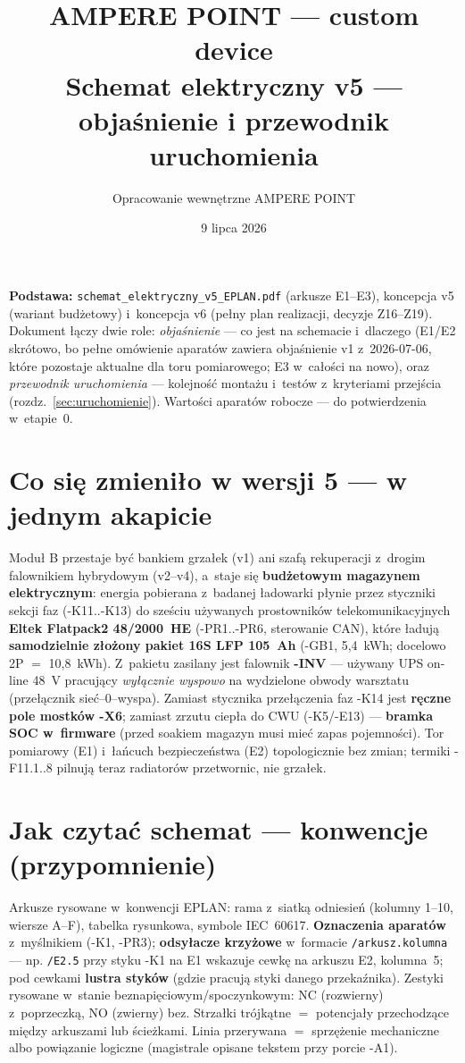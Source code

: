 \documentclass[11pt,a4paper]{article}
\title{\textbf{AMPERE POINT --- custom device}\\[4pt]
\large Schemat elektryczny v5 --- objaśnienie i przewodnik uruchomienia}
\author{Opracowanie wewnętrzne AMPERE POINT}
\date{9 lipca 2026}
\begin{document}
\maketitle
\vspace{-1.6em}

\noindent\textbf{Podstawa:} \texttt{schemat\_elektryczny\_v5\_EPLAN.pdf} (arkusze E1--E3), koncepcja v5 (wariant budżetowy)
i~koncepcja v6 (pełny plan realizacji, decyzje Z16--Z19). Dokument łączy dwie role: \emph{objaśnienie} --- co jest na
schemacie i~dlaczego (E1/E2 skrótowo, bo pełne omówienie aparatów zawiera objaśnienie v1 z~2026-07-06, które pozostaje
aktualne dla toru pomiarowego; E3 w~całości na nowo), oraz \emph{przewodnik uruchomienia} --- kolejność montażu
i~testów z~kryteriami przejścia (rozdz.~\ref{sec:uruchomienie}). Wartości aparatów robocze --- do potwierdzenia
w~etapie~0.

\tableofcontents

\section{Co się zmieniło w wersji 5 --- w jednym akapicie}
\label{sec:zmiany}
Moduł B przestaje być bankiem grzałek (v1) ani szafą rekuperacji z~drogim falownikiem hybrydowym (v2--v4),
a~staje się \textbf{budżetowym magazynem elektrycznym}: energia pobierana z~badanej ładowarki płynie przez
styczniki sekcji faz (-K11..-K13) do sześciu używanych prostowników telekomunikacyjnych \textbf{Eltek Flatpack2
48/2000~HE} (-PR1..-PR6, sterowanie CAN), które ładują \textbf{samodzielnie złożony pakiet 16S LFP 105~Ah}
(-GB1, 5,4~kWh; docelowo 2P $=$ 10,8~kWh). Z~pakietu zasilany jest falownik \textbf{-INV} --- używany UPS on-line
48~V pracujący \emph{wyłącznie wyspowo} na wydzielone obwody warsztatu (przełącznik sieć--0--wyspa). Zamiast
stycznika przełączenia faz -K14 jest \textbf{ręczne pole mostków -X6}; zamiast zrzutu ciepła do CWU (-K5/-E13) ---
\textbf{bramka SOC w~firmware} (przed soakiem magazyn musi mieć zapas pojemności). Tor pomiarowy (E1) i~łańcuch
bezpieczeństwa (E2) topologicznie bez zmian; termiki -F11.1..8 pilnują teraz radiatorów przetwornic, nie grzałek.

\section{Jak czytać schemat --- konwencje (przypomnienie)}
Arkusze rysowane w~konwencji EPLAN: rama z~siatką odniesień (kolumny 1--10, wiersze A--F), tabelka rysunkowa,
symbole IEC~60617. \textbf{Oznaczenia aparatów} z~myślnikiem (-K1, -PR3); \textbf{odsyłacze krzyżowe} w~formacie
\texttt{/arkusz.kolumna} --- np. \texttt{/E2.5} przy styku -K1 na E1 wskazuje cewkę na arkuszu E2, kolumna~5;
pod cewkami \textbf{lustra styków} (gdzie pracują styki danego przekaźnika). Zestyki rysowane w~stanie
beznapięciowym/spoczynkowym: NC (rozwierny) z~poprzeczką, NO (zwierny) bez. Strzałki trójkątne $=$ potencjały
przechodzące między arkuszami lub ścieżkami. Linia przerywana $=$ sprzężenie mechaniczne albo powiązanie
logiczne (magistrale opisane tekstem przy porcie -A1).
\end{document}
